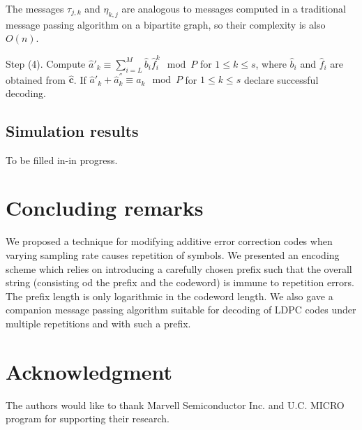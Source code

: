 The messages $\tau_{j,k}$ and $\eta_{k,j}$ are analogous to
messages computed in a traditional message passing algorithm on a
bipartite graph, so their complexity is also $O(n)$.

Step (4). Compute $\hat{a}'_k \equiv \sum_{i=L}^{M} \hat{b}_i
\hat{f}_i^k \mod P$ for $1\leq k \leq s$, where $\hat{b}_i$ and
$\hat{f}_i$ are obtained from $\mathbf{\hat{c}}$. If
$\hat{a}'_k+\hat{a}^{''}_k \equiv a_k \mod P$ for $1\leq k \leq s$
declare successful decoding.
\subsection{Simulation results}
To be filled in-in progress.\vspace{0in}
\section{Concluding remarks}
We proposed a technique for modifying additive error correction
codes when varying sampling rate causes repetition of symbols. We
presented an encoding scheme which relies on introducing a
carefully chosen prefix such that the overall string (consisting
od the prefix and the codeword) is immune to repetition errors.
The prefix length is only logarithmic in the codeword length. We
also gave a companion message passing algorithm suitable for
decoding of LDPC codes under multiple repetitions and with such a
prefix.

\section*{Acknowledgment}
The authors would like to thank Marvell Semiconductor Inc. and
U.C. MICRO program for supporting their research.

